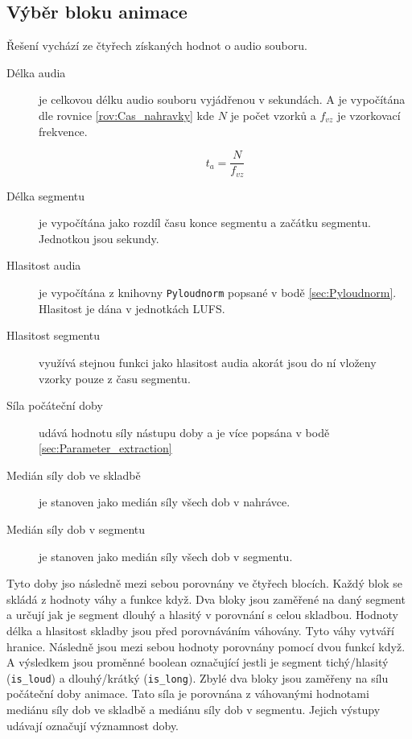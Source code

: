 \subsection{Výběr bloku animace} \label{sec:Vyber_bloku_animace}

Řešení vychází ze čtyřech získaných hodnot o audio souboru.

\begin{description}
    \item[Délka audia] je celkovou délku audio souboru vyjádřenou v sekundách. A je vypočítána dle rovnice \ref{rov:Cas_nahravky} kde $N$ je počet vzorků a $f_{vz}$ je vzorkovací frekvence. 

    \begin{equation}
        t_{a} = \frac{N}{f_{vz}}
        \label{rov:Cas_nahravky}
    \end{equation}

    \item[Délka segmentu] je vypočítána jako rozdíl času konce segmentu a začátku segmentu. Jednotkou jsou sekundy. 
    \item[Hlasitost audia] je vypočítána z knihovny \texttt{Pyloudnorm} popsané v bodě \ref{sec:Pyloudnorm}. Hlasitost je dána v jednotkách LUFS.
    \item[Hlasitost segmentu] využívá stejnou funkci jako hlasitost audia akorát jsou do ní vloženy vzorky pouze z času segmentu. 
    \item[Síla počáteční doby] udává hodnotu síly nástupu doby a je více popsána v bodě \ref{sec:Parameter_extraction}
    \item[Medián síly dob ve skladbě] je stanoven jako medián síly všech dob v nahrávce. 
    \item[Medián síly dob v segmentu] je stanoven jako medián  síly všech dob v segmentu. 
\end{description}
Tyto doby jso následně mezi sebou porovnány ve čtyřech blocích. Každý blok se skládá z hodnoty váhy a funkce když. Dva bloky jsou zaměřené na daný segment a určují jak je segment dlouhý a hlasitý v porovnání s celou skladbou. Hodnoty délka a hlasitost skladby jsou před porovnáváním váhovány. Tyto váhy vytváří hranice. Následně jsou mezi sebou hodnoty porovnány pomocí dvou funkcí když. A výsledkem jsou proměnné boolean označující jestli je segment tichý/hlasitý (\texttt{is\_loud}) a dlouhý/krátký (\texttt{is\_long}). Zbylé dva bloky jsou zaměřeny na sílu počáteční doby animace. Tato síla je porovnána z váhovanými hodnotami mediánu síly dob ve skladbě a mediánu síly dob v segmentu. Jejich výstupy udávají označují významnost doby. 

